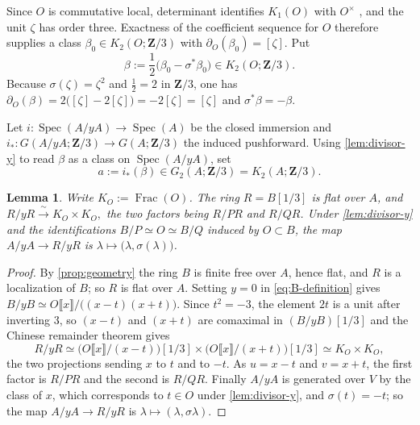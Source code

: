 \documentclass[10pt]{amsart}
\DeclareMathOperator{\Frac}{Frac}
\DeclareMathOperator{\Spec}{Spec}
\newtheorem{lemma}[lemma]{Lemma}
\theoremstyle{remark}
\begin{document}
Since $O$ is commutative local, determinant identifies $K_1(O)$ with
$O^\times$ \cite[Lem.~III.1.4]{Weibel13KBook}, and the unit $\zeta$ has
order three.  Exactness of the coefficient sequence for $O$ therefore
supplies a class $\beta_0\in K_2(O;\mathbf Z/3)$ with
$\partial_O(\beta_0)=[\zeta]$.  Put
\begin{equation}\label{eq:beta-definition}
	\beta:=\frac12\bigl(\beta_0-\sigma^*\beta_0\bigr)\in K_2(O;\mathbf Z/3).
\end{equation}
Because $\sigma(\zeta)=\zeta^2$ and $\tfrac12=2$ in $\mathbf Z/3$, one has
$\partial_O(\beta)=2\bigl([\zeta]-2[\zeta]\bigr)=-2[\zeta]=[\zeta]$ and
$\sigma^*\beta=-\beta$.

Let $i\colon\Spec(A/yA)\to\Spec(A)$ be the closed immersion and
$i_*\colon G(A/yA;\mathbf Z/3)\to G(A;\mathbf Z/3)$ the induced pushforward.
Using \cref{lem:divisor-y} to read $\beta$ as a class on $\Spec(A/yA)$, set
\begin{equation}\label{eq:a-definition}
	a:=i_*(\beta)\in G_2(A;\mathbf Z/3)=K_2(A;\mathbf Z/3).
\end{equation}


\begin{lemma}\label{lem:split-fibre}
	Write \(K_O:=\Frac(O)\).  The ring \(R=B[1/3]\) is flat over \(A\), and
	\(
	R/yR\xrightarrow{\ \sim\ }K_O\times K_O ,
	\)
	the two factors being $R/PR$ and $R/QR$.  Under \cref{lem:divisor-y} and
	the identifications $B/P\simeq O\simeq B/Q$ induced by $O\subset B$, the
	map $A/yA\to R/yR$ is $\lambda\mapsto\bigl(\lambda,\sigma(\lambda)\bigr)$.
\end{lemma}
\begin{proof}
	By \cref{prop:geometry} the ring $B$ is finite free over $A$, hence flat,
	and $R$ is a localization of $B$; so $R$ is flat over $A$.  Setting
	$y=0$ in \eqref{eq:B-definition} gives
	$B/yB\simeq O\llbracket x\rrbracket/\bigl((x-t)(x+t)\bigr)$.  Since
	$t^2=-3$, the element $2t$ is a unit after inverting $3$, so $(x-t)$ and
	$(x+t)$ are comaximal in $(B/yB)[1/3]$ and the Chinese remainder theorem
	gives
	\[
	R/yR\simeq
	\bigl(O\llbracket x\rrbracket/(x-t)\bigr)[1/3]\times
	\bigl(O\llbracket x\rrbracket/(x+t)\bigr)[1/3]
	\simeq K_O\times K_O ,
	\]
	the two projections sending $x$ to $t$ and to $-t$.  As $u=x-t$ and
	$v=x+t$, the first factor is $R/PR$ and the second is $R/QR$.  Finally
	$A/yA$ is generated over $V$ by the class of $x$, which corresponds to
	$t\in O$ under \cref{lem:divisor-y}, and $\sigma(t)=-t$; so the map
	$A/yA\to R/yR$ is $\lambda\mapsto(\lambda,\sigma\lambda)$.
\end{proof}
\end{document}
